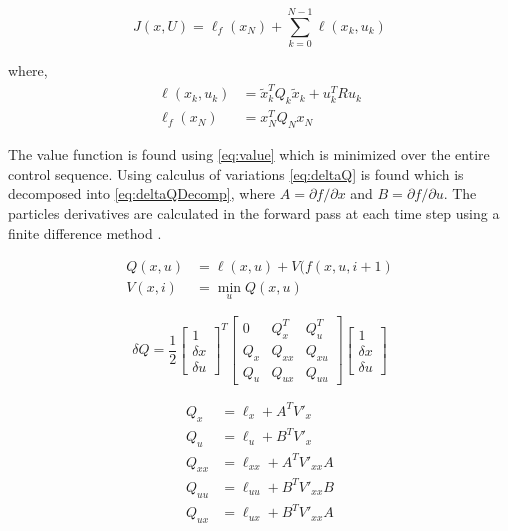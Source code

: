 \begin{equation}
    J(x,U) = \ell_f (x_N) + \sum_{k=0}^{N-1} \ell(x_k, u_k) 
    \label{eq:cost}
\end{equation}

where,
\begin{equation}
    \begin{split}
            \ell(x_k, u_k) &= \tilde{x}_k^T Q_k \tilde{x}_k + u_k^T R u_k \\
    \ell_f(x_N) &= x^{T}_{N} Q_N x_{N}
    \end{split}
      \label{eq:mycost}
\end{equation}

The value function is found using \autoref{eq:value} which is minimized over the entire control sequence. Using calculus of variations \autoref{eq:deltaQ} is found which is decomposed into  \autoref{eq:deltaQDecomp}, where $ A =\partial f / \partial x$ and  $B = \partial f / \partial u$. The particles derivatives are calculated in the forward pass at each time step using a finite difference method \cite{iLQR_Zachary2016}. 


\begin{equation}
    \begin{split}
        Q(x,u) &= \ell (x,u) + V(f(x,u,i+1) \\
        V(x,i) &= \min\limits_{u} Q(x,u)
    \end{split}
    \label{eq:value}
\end{equation}


\begin{equation}
     \delta Q = 
     \frac{1}{2}
     \begin{bmatrix}
     1 \\
     \delta x \\
     \delta u
     \end{bmatrix}^T
       \begin{bmatrix}
        0       & Q^T_{x} & Q^T_{u}  \\
        Q_{x}   & Q_{xx} & Q_{xu}  \\
        Q_{u}   & Q_{ux} & Q_{uu} 
    \end{bmatrix}
    \begin{bmatrix}
     1 \\
     \delta x \\
     \delta u
     \end{bmatrix}
        \label{eq:deltaQ}
\end{equation}

\begin{equation}
    \begin{split}
        Q_x &= \ell_x + A^T V'_x \\
        Q_u &= \ell_u + B^T V'_x \\
        Q_{xx} &= \ell_{xx} + A^T V'_{xx}A \\
        Q_{uu} &= \ell_{uu} + B^T V'_{xx}B \\
        Q_{ux} &= \ell_{ux} + B^T V'_{xx}A \\
    \end{split}
    \label{eq:deltaQDecomp}
\end{equation}



